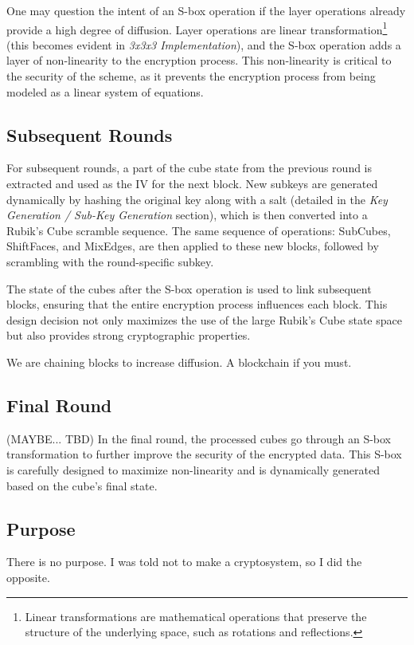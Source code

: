 \documentclass[12pt]{article}
\begin{document}
One may question the intent of an S-box operation if the layer operations already provide a high degree of diffusion. Layer operations are linear transformation\footnote{Linear transformations are mathematical operations that preserve the structure of the underlying space, such as rotations and reflections.} (this becomes evident in \textit{3x3x3 Implementation}), and the S-box operation adds a layer of non-linearity to the encryption process. This non-linearity is critical to the security of the scheme, as it prevents the encryption process from being modeled as a linear system of equations. 

\vspace{0.5cm}

\subsection{Subsequent Rounds}
For subsequent rounds, a part of the cube state from the previous round is extracted and used as the IV for the next block. New subkeys are generated dynamically by hashing the original key along with a salt (detailed in the \textit{Key Generation / Sub-Key Generation} section), which is then converted into a Rubik's Cube scramble sequence. The same sequence of operations: SubCubes, ShiftFaces, and MixEdges, are then applied to these new blocks, followed by scrambling with the round-specific subkey.

The state of the cubes after the S-box operation is used to link subsequent blocks, ensuring that the entire encryption process influences each block. This design decision not only maximizes the use of the large Rubik's Cube state space but also provides strong cryptographic properties.

We are chaining blocks to increase diffusion. A blockchain if you must.
\subsection{Final Round}

(MAYBE... TBD) In the final round, the processed cubes go through an S-box transformation to further improve the security of the encrypted data. This S-box is carefully designed to maximize non-linearity and is dynamically generated based on the cube's final state.

\subsection{Purpose}
There is no purpose. I was told not to make a cryptosystem, so I did the opposite.
\end{document}
